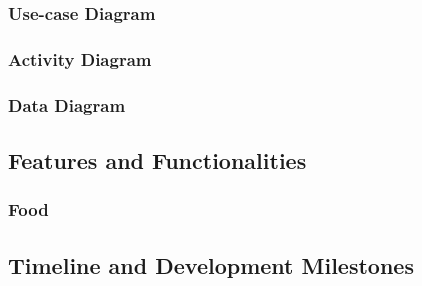 \documentclass[11pt]{article}
\begin{document}
\subsubsection{Use-case Diagram}
\subsubsection{Activity Diagram}
\subsubsection{Data Diagram}


\subsection{Features and Functionalities}
\subsubsection{Food}


\subsection{Timeline and Development Milestones}
\end{document}
